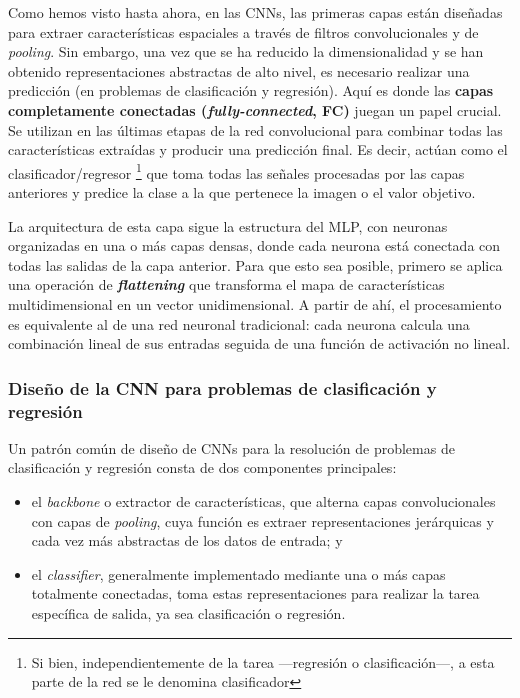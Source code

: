 Como hemos visto hasta ahora, en las CNNs, las primeras capas están diseñadas para extraer características
espaciales a través de filtros convolucionales y de \textit{pooling}. Sin embargo, una vez que se ha reducido 
la dimensionalidad y se han obtenido representaciones abstractas de alto nivel, es necesario realizar una 
predicción (en problemas de clasificación y regresión). 
Aquí es donde las \textbf{capas completamente conectadas (\textit{fully-connected}, FC)} juegan un papel 
crucial. Se utilizan en las últimas etapas de la red convolucional para combinar todas las características 
extraídas y producir una predicción final. Es decir, actúan como el clasificador/regresor
\footnote{
    Si bien, independientemente de la tarea ---regresión o clasificación---, a esta parte de la red se le 
    denomina clasificador
} 
que toma todas las señales procesadas por las capas anteriores y predice la clase a la que pertenece la imagen 
o el valor objetivo. 

La arquitectura de esta capa sigue la estructura del MLP, con neuronas organizadas en una o más capas densas, 
donde cada neurona está conectada con todas las salidas de la capa anterior. Para que esto sea posible, 
primero se aplica una operación de \textbf{\textit{flattening}} que transforma el mapa de características 
multidimensional en un vector unidimensional. A partir de ahí, el procesamiento es equivalente al de una red 
neuronal tradicional: cada neurona calcula una combinación lineal de sus entradas seguida de una función de 
activación no lineal.


\subsubsection{Diseño de la CNN para problemas de clasificación y regresión}

Un patrón común de diseño de CNNs para la resolución de problemas de clasificación y regresión consta de dos
componentes principales:

\begin{itemize}

    \item el \textit{backbone} o extractor de características, que alterna capas convolucionales con capas de
    \textit{pooling}, cuya función es extraer representaciones jerárquicas y cada vez más abstractas de los 
    datos de entrada; y

    \item el \textit{classifier}, generalmente implementado mediante una o más capas totalmente conectadas, 
    toma estas representaciones para realizar la tarea específica de salida, ya sea clasificación o regresión.

\end{itemize}


